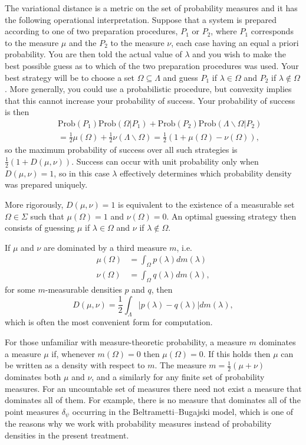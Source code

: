 \documentclass[DIV=calc,paper=a4,fontsize=11pt,twocolumn]{scrartcl} %
\theoremstyle{definition}
\theoremstyle{plain}
\begin{document}
The variational distance is a metric on the set of probability
measures and it has the following operational interpretation.  Suppose
that a system is prepared according to one of two preparation
procedures, $P_1$ or $P_2$, where $P_1$ corresponds to the measure
$\mu$ and the $P_2$ to the measure $\nu$, each case having an equal a
priori probability.  You are then told the actual value of $\lambda$
and you wish to make the best possible guess as to which of the two
preparation procedures was used.  Your best strategy will be to choose
a set $\Omega \subseteq \Lambda$ and guess $P_1$ if $\lambda \in
\Omega$ and $P_2$ if $\lambda \notin \Omega$.  More generally, you
could use a probabilistic procedure, but convexity implies that this
cannot increase your probability of success.  Your probability of
success is then
\begin{align}
&&\text{Prob}(P_1)\text{Prob}(\Omega|P_1) + \text{Prob}(P_2)
\text{Prob}(\Lambda \backslash \Omega|P_2)\nonumber\\
&&=\frac{1}{2}\mu(\Omega) + \frac{1}{2}\nu(\Lambda \backslash \Omega)
=\frac{1}{2} \left ( 1 + \mu(\Omega) - \nu(\Omega) \right ),
\end{align}
so the maximum probability of success over all such strategies is
$\frac{1}{2} \left ( 1 + D(\mu,\nu) \right )$.  Success can occur with
unit probability only when $D(\mu,\nu) = 1$, so in this case $\lambda$
effectively determines which probability density was prepared
uniquely.

More rigorously, $D(\mu,\nu) = 1$ is equivalent to the existence of a
measurable set $\Omega \in \Sigma$ such that $\mu(\Omega) = 1$ and
$\nu(\Omega) = 0$.  An optimal guessing strategy then consists of
guessing $\mu$ if $\lambda \in \Omega$ and $\nu$ if $\lambda \notin
\Omega$.

If $\mu$ and $\nu$ are dominated by a third measure $m$, i.e.
\begin{align}
\mu(\Omega) & = \int_{\Omega} p(\lambda)dm(\lambda) \\
\nu(\Omega) & = \int_{\Omega} q(\lambda) dm(\lambda),
\end{align}
for some $m$-measurable densities $p$ and $q$, then
\begin{equation}
\label{eq:POEM:intvar}
D(\mu, \nu) = \frac{1}{2} \int_{\Lambda} \left | p(\lambda) -
q(\lambda) \right | dm(\lambda),
\end{equation}
which is often the most convenient form for computation.

For those unfamiliar with measure-theoretic probability, a measure $m$
dominates a measure $\mu$ if, whenever $m(\Omega) = 0$ then
$\mu(\Omega) = 0$.  If this holds then $\mu$ can be written as a
density with respect to $m$.  The measure $m = \frac{1}{2} \left (\mu
+ \nu \right )$ dominates both $\mu$ and $\nu$, and a similarly for
any finite set of probability measures.  For an uncountable set of
measures there need not exist a measure that dominates all of them.
For example, there is no measure that dominates all of the point
measures $\delta_{\psi}$ occurring in the Beltrametti--Bugajski model,
which is one of the reasons why we work with probability measures
instead of probability densities in the present treatment.
\end{document}
